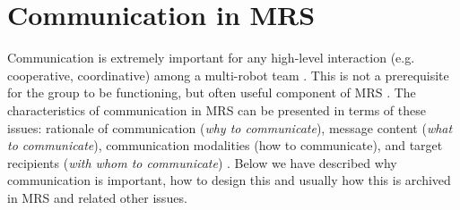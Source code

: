 \section{Communication in MRS}
\label{bg:mrs-comm}
Communication is extremely important for any high-level interaction (e.g. cooperative, coordinative) among a multi-robot team \cite{Arkin1998}. This is not a prerequisite for the group to be functioning, but often useful component of MRS \cite{Mataric2007}. The characteristics of  communication in MRS can be presented in terms of these issues: rationale of communication ({\em why to communicate}), message content ({\em what to communicate}), communication modalities (how to communicate),  and target recipients ({\em with whom to communicate}) . Below we have described why communication is important, how to design this and usually how this is archived in MRS and related other issues.
